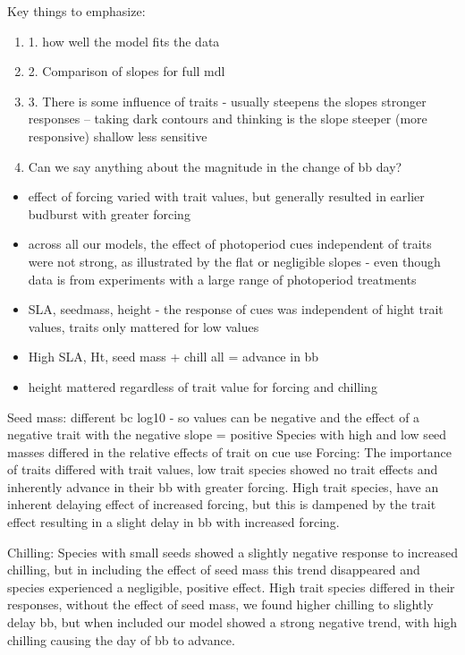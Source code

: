 \documentclass{article}\usepackage[]{graphicx}\usepackage[]{color}
\begin{document}
Key things to emphasize:
\begin{enumerate}
\item 1. how well the model fits the data
\item 2. Comparison of slopes for full mdl 
\item 3. There is some influence of traits - usually steepens the slopes stronger responses -- taking dark contours and thinking is the slope steeper (more responsive) shallow less sensitive 
\item Can we say anything about the magnitude in the change of bb day?
\end{enumerate}

\begin{itemize}
\item effect of forcing varied with trait values, but generally resulted in earlier budburst with greater forcing
\item across all our models, the effect of photoperiod cues independent of traits were not strong, as illustrated by the flat or negligible slopes - even though data is from experiments with a large range of photoperiod treatments
\item SLA, seedmass, height - the response of cues was independent of hight trait values, traits only mattered for low values
\item High SLA, Ht, seed mass + chill all = advance in bb
\item height mattered regardless of trait value for forcing and chilling
\end{itemize}



Seed mass: different bc log10 - so values can be negative and the effect of a negative trait with the negative slope = positive
Species with high and low seed masses differed in the relative effects of trait on cue use 
Forcing: The importance of traits differed with trait values, low trait species showed no trait effects and inherently advance in their bb with greater forcing. High trait species, have an inherent delaying effect of increased forcing, but this is dampened by the trait effect resulting in a slight delay in bb with increased forcing.

Chilling: Species with small seeds showed a slightly negative response to increased chilling, but in including the effect of seed mass this trend disappeared and species experienced a negligible, positive effect. High trait species differed in their responses, without the effect of seed mass, we found higher chilling to slightly delay bb, but when included our model showed a strong negative trend, with high chilling causing the day of bb to advance. 
\end{document}
